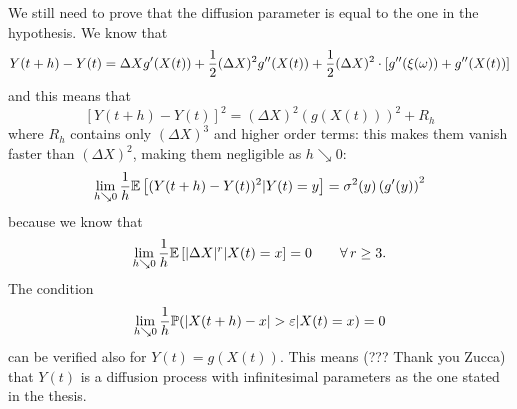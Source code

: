 \documentclass[12pt]{report}
\begin{document}
\begin{fancyproof}
\begin{equation*}
	\end{equation*}
	We still need to prove that the diffusion parameter is equal to the one in the hypothesis. We know that
	\begin{equation*}
		Y(t+h)-Y(t)=\Delta X g'(X(t))+\frac{1}{2}(\Delta X)^{2}g''(X(t))+\frac{1}{2}(\Delta X)^{2}\cdot[g''(\xi(\omega))+g''(X(t))]
	\end{equation*}
	and this means that 
	\begin{equation*}
		\left[Y(t+h)-Y(t)\right]^{2}=(\Delta X)^{2}(g(X(t)))^{2}+R_{h}
	\end{equation*}
	where $R_{h}$ contains only $(\Delta X)^{3}$ and higher order terms: this makes them vanish faster than $(\Delta X)^{2}$, making them negligible as $h\searrow0$:
	\begin{equation*}
		\lim_{h\searrow0}\frac{1}{h}\mathbb{E}\left[(Y(t+h)-Y(t))^{2}|Y(t)=y\right]=\sigma^{2}(y)\left(g'(y)\right)^{2}
	\end{equation*}
	because we know that
	\begin{equation*}
		\lim_{h\searrow0}\frac{1}{h}\mathbb{E}\left[|\Delta X|^{r}|X(t)=x\right]=0\qquad\forall\, r\geq 3.
	\end{equation*}
	The condition
	\begin{equation*}
		\lim_{h\searrow0}\frac{1}{h}\pr(|X(t+h)-x|>\varepsilon|X(t)=x)=0
	\end{equation*}
	can be verified also for $Y(t)=g(X(t))$. This means (??? Thank you Zucca) that $Y(t)$ is a diffusion process with infinitesimal parameters as the one stated in the thesis.
\end{fancyproof}
\end{document}
